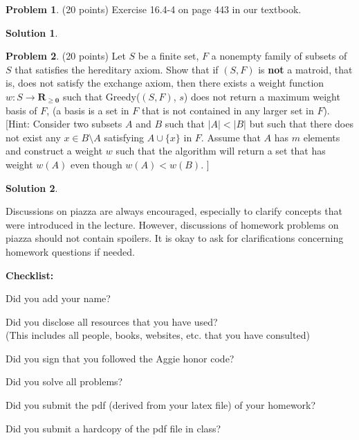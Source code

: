 \documentclass{article}
\theoremstyle{definition}
\newtheorem{problem}{Problem}
\newtheorem*{solution}{Solution}
\newcommand{\checklist}{\noindent\textbf{Checklist:}
\begin{compactitem}[$\Box$] 
\item Did you add your name? 
\item Did you disclose all resources that you have used? \\
(This includes all people, books, websites, etc. that you have consulted)
\item Did you sign that you followed the Aggie honor code? 
\item Did you solve all problems? 
\item Did you submit the pdf (derived from your latex file)
  of your homework?
\item Did you submit a hardcopy of the pdf file in class? 
\end{compactitem}
}
\begin{document}
\begin{problem}(20 points)
Exercise 16.4-4 on page 443 in our textbook. 
\end{problem}
\begin{solution}
\end{solution}

\begin{problem}(20 points)
  Let $S$ be a finite set, $F$ a nonempty family of subsets of $S$ that
  satisfies the hereditary axiom. Show that if $(S,F)$ is \textbf{not}
  a matroid, that is, does not satisfy the exchange axiom, then there
  exists a weight function $w\colon S \rightarrow \mathbf{R_{\ge 0}}$
  such that Greedy($(S,F)$, $s$) does not return a maximum weight
  basis of $F$, (a basis is a set in $F$ that is not contained in any
  larger set in $F$). [Hint: Consider two subsets $A$ and $B$ such
  that $|A|<|B|$ but such that there does not exist any $x\in
  B\setminus A$ satisfying $A\cup \{x\}$ in $F$. Assume that $A$ has
  $m$ elements and construct a weight $w$ such that the algorithm will
  return a set that has weight $w(A)$ even though $w(A)<w(B)$. ]
\end{problem}
\begin{solution}
\end{solution}







Discussions on piazza are always encouraged, especially to clarify
concepts that were introduced in the lecture. However, discussions of
homework problems on piazza should not contain spoilers. It is okay to
ask for clarifications concerning homework questions if needed. 
\medskip



\goodbreak
\checklist
\end{document}
